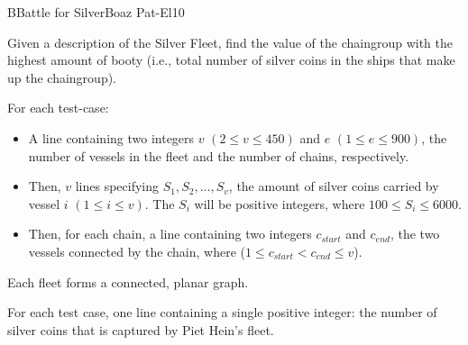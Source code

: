 \begin{icpcproblem}{B}{Battle for Silver}{Boaz Pat-El}{10}

Given a description of the Silver Fleet, find the value of the chaingroup with the highest amount of booty
(i.e., total number of silver coins in the ships that make up the chaingroup).


For each test-case:
\begin{itemize}
\setlength{\itemsep}{-1mm}
\item A line containing two integers $v$ $(2 \leq v \leq 450)$ and $e$ $(1 \leq e \leq 900)$, the number of vessels in the fleet and the number of chains, respectively.
\item Then, $v$ lines specifying $S_1, S_2, \ldots, S_v$, the amount of silver coins carried by vessel $i$ $(1 \le i \le v)$.
      The $S_i$ will be positive integers, where $100 \leq S_i \leq 6000$.
\item Then, for each chain, a line containing two integers $c_{start}$ and $c_{end}$,
      the two vessels connected by the chain, where ($1 \le c_{start} < c_{end} \leq v$).
\end{itemize}

Each fleet forms a connected, planar graph.


For each test case, one line containing a single positive integer: the number of silver coins that is captured by Piet Hein's fleet.


\end{icpcproblem}
